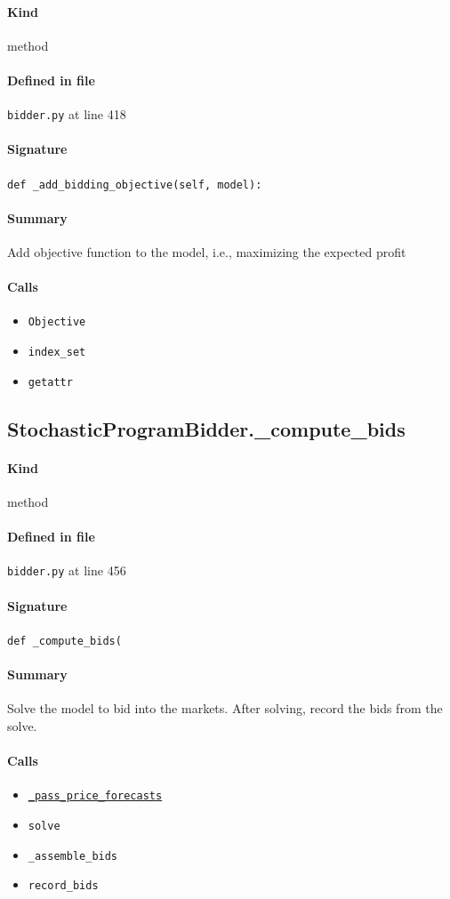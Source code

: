 \documentclass[11pt]{report}
\begin{document}
\paragraph{Kind} method
\paragraph{Defined in file} \texttt{bidder.py} at line 418
\paragraph{Signature} \texttt{def \_add\_bidding\_objective(self, model):}
\paragraph{Summary} Add objective function to the model, i.e., maximizing the expected profit
\paragraph{Calls}
\begin{itemize}[leftmargin=*]
  \item \texttt{Objective}
  \item \texttt{index\_set}
  \item \texttt{getattr}
\end{itemize}
\subsection{StochasticProgramBidder.\_compute\_bids}
\label{def:bidder.py:StochasticProgramBidder._compute_bids:L456}
\paragraph{Kind} method
\paragraph{Defined in file} \texttt{bidder.py} at line 456
\paragraph{Signature} \texttt{def \_compute\_bids(}
\paragraph{Summary} Solve the model to bid into the markets. After solving, record the bids from the solve.
\paragraph{Calls}
\begin{itemize}[leftmargin=*]
  \item \hyperref[def:bidder.py:StochasticProgramBidder._pass_price_forecasts:L724]{\texttt{\_pass\_price\_forecasts}}
  \item \texttt{solve}
  \item \texttt{\_assemble\_bids}
  \item \texttt{record\_bids}
\end{itemize}
\end{document}
